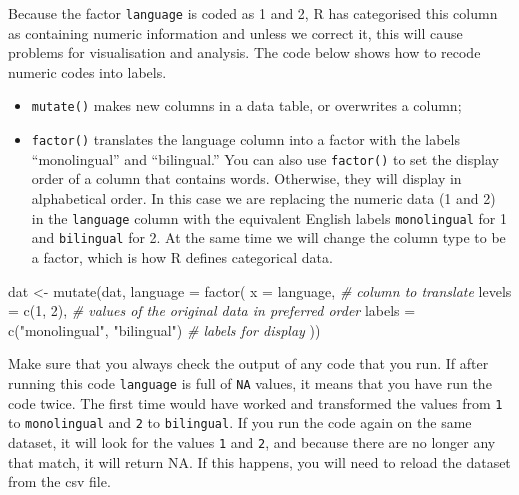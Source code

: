 \documentclass[
  english,
  doc,floatsintext]{apa6}
\newenvironment{Shaded}{\begin{snugshade}}{\end{snugshade}}
\newcommand{\AttributeTok}[1]{\textcolor[rgb]{0.77,0.63,0.00}{#1}}
\newcommand{\CommentTok}[1]{\textcolor[rgb]{0.56,0.35,0.01}{\textit{#1}}}
\newcommand{\DecValTok}[1]{\textcolor[rgb]{0.00,0.00,0.81}{#1}}
\newcommand{\FunctionTok}[1]{\textcolor[rgb]{0.00,0.00,0.00}{#1}}
\newcommand{\NormalTok}[1]{#1}
\newcommand{\OtherTok}[1]{\textcolor[rgb]{0.56,0.35,0.01}{#1}}
\newcommand{\StringTok}[1]{\textcolor[rgb]{0.31,0.60,0.02}{#1}}
\providecommand{\tightlist}{%
  \setlength{\itemsep}{0pt}\setlength{\parskip}{0pt}}
\begin{document}
Because the factor \texttt{language} is coded as 1 and 2, R has categorised this column as containing numeric information and unless we correct it, this will cause problems for visualisation and analysis. The code below shows how to recode numeric codes into labels.

\begin{itemize}
\tightlist
\item
  \texttt{mutate()} makes new columns in a data table, or overwrites a column;
\item
  \texttt{factor()} translates the language column into a factor with the labels ``monolingual'' and ``bilingual.'' You can also use \texttt{factor()} to set the display order of a column that contains words. Otherwise, they will display in alphabetical order. In this case we are replacing the numeric data (1 and 2) in the \texttt{language} column with the equivalent English labels \texttt{monolingual} for 1 and \texttt{bilingual} for 2. At the same time we will change the column type to be a factor, which is how R defines categorical data.
\end{itemize}

\begin{Shaded}
\begin{Highlighting}[]
\NormalTok{dat }\OtherTok{\textless{}{-}} \FunctionTok{mutate}\NormalTok{(dat, }\AttributeTok{language =} \FunctionTok{factor}\NormalTok{(}
  \AttributeTok{x =}\NormalTok{ language, }\CommentTok{\# column to translate}
  \AttributeTok{levels =} \FunctionTok{c}\NormalTok{(}\DecValTok{1}\NormalTok{, }\DecValTok{2}\NormalTok{), }\CommentTok{\# values of the original data in preferred order}
  \AttributeTok{labels =} \FunctionTok{c}\NormalTok{(}\StringTok{"monolingual"}\NormalTok{, }\StringTok{"bilingual"}\NormalTok{) }\CommentTok{\# labels for display}
\NormalTok{))}
\end{Highlighting}
\end{Shaded}

Make sure that you always check the output of any code that you run. If after running this code \texttt{language} is full of \texttt{NA} values, it means that you have run the code twice. The first time would have worked and transformed the values from \texttt{1} to \texttt{monolingual} and \texttt{2} to \texttt{bilingual}. If you run the code again on the same dataset, it will look for the values \texttt{1} and \texttt{2}, and because there are no longer any that match, it will return NA. If this happens, you will need to reload the dataset from the csv file.
\end{document}
